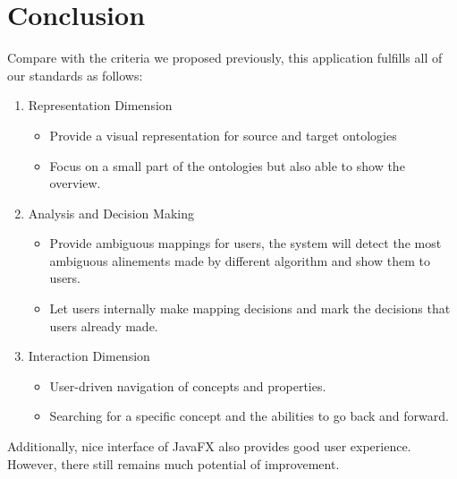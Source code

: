 \chapter{Conclusion}
Compare with the criteria we proposed previously, this application fulfills all of our standards as follows:
\begin{enumerate}
	\item Representation Dimension
	\begin{itemize}
		\item Provide a visual representation for source and target ontologies
		\item Focus on a small part of the ontologies but also able to show the overview.
	\end{itemize}
	
	\item Analysis and Decision Making
	\begin{itemize}
		\item Provide ambiguous mappings for users, the system will detect the most ambiguous alinements made by different algorithm and show them to users.
		\item Let users internally make mapping decisions and mark the decisions that users already made.
	\end{itemize}
	\item Interaction Dimension
	\begin{itemize}
	 	\item User-driven navigation of concepts and properties.
		\item Searching for a specific concept and the abilities to go back and forward.
	\end{itemize}
\end{enumerate}

Additionally, nice interface of JavaFX also provides good user experience. However, there still remains much potential of improvement. 
